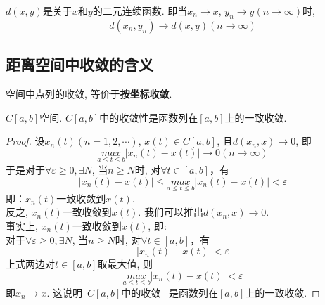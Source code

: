 \documentclass[lang=cn,10pt]{gorgeousnbook}
\numberwithin{equation}{section}%
\numberwithin{figure}{section}%
\begin{document}
\begin{theorem}
$d(x,y)$是关于$x$和$y$的二元连续函数. 即当$x_n\rightarrow x$, $y_n\rightarrow y (n\rightarrow \infty)$时,
\begin{equation}
d(x_n,y_n)\rightarrow d(x,y) (n\rightarrow \infty)  \nonumber
\end{equation}
\end{theorem}



\subsection{距离空间中收敛的含义}
空间中点列的收敛, 等价于\textbf{按坐标收敛}. 
\begin{exercise}
$C[a,b]$空间. $C[a,b]$中的收敛性是函数列在$[a,b]$上的一致收敛. 
\end{exercise}
\begin{proof}
设$x_n(t)(n=1,2,\cdots)$, $x(t)\in C[a,b]$, 且$d(x_n,x)\rightarrow 0$, 即
\begin{equation}
  \underset{a\le t\le b}{max}\left|x_n(t)-x(t) \right|\rightarrow 0 (n\rightarrow \infty) \nonumber
\end{equation}
于是对于$\forall \varepsilon \geqslant 0,\exists N$, 当$n\geqslant N$时, 对$\forall t \in [a,b]$，有
\begin{equation}
  \left|x_n(t)-x(t)\right|\leqslant \underset{a\le t\le b}{max}\left|x_n(t)-x(t) \right|< \varepsilon
  \nonumber
\end{equation}
即：$x_n(t)$一致收敛到$x(t)$. \\
反之, $x_n(t)$一致收敛到$x(t)$. 我们可以推出$d(x_n,x)\rightarrow 0$.\\
事实上, $x_n(t)$一致收敛到$x(t)$, 即: \\
对于$\forall \varepsilon \geqslant 0,\exists N$, 当$n\geqslant N$时, 对$\forall t \in [a,b]$，有 
\begin{equation}
  \left|x_n(t)-x(t)\right|< \varepsilon
  \nonumber
\end{equation}
上式两边对$t\in [a,b]$取最大值, 则
\begin{equation}
  \underset{a\le t\le b}{max}\left|x_n(t)-x(t) \right|< \varepsilon
  \nonumber
\end{equation}
即$x_n\rightarrow x$. 这说明\ $C[a,b]$中的收敛 \ 是函数列在$[a,b]$上的一致收敛.
\end{proof}
\end{document}
